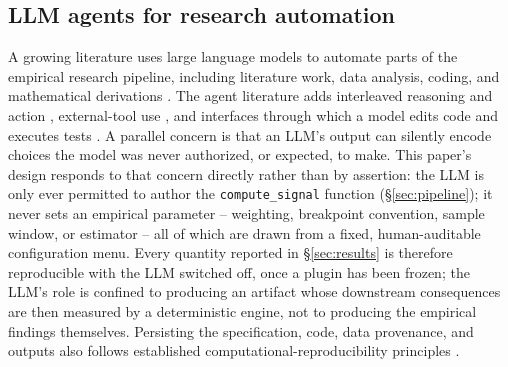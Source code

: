 \subsection{LLM agents for research automation}

A growing literature uses large language models to automate parts of the
empirical research pipeline, including literature work, data analysis, coding,
and mathematical derivations \citep{Korinek2023}. The agent literature adds
interleaved reasoning and action \citep{YaoEtAl2023ReAct}, external-tool use
\citep{SchickEtAl2023Toolformer}, and interfaces through which a model edits
code and executes tests \citep{YangEtAl2024SWEAgent}. A parallel concern is
that an LLM's output can silently encode choices the model was never
authorized, or expected, to make. This paper's design responds to that concern
directly rather than by assertion: the LLM is only ever permitted to author
the \texttt{compute\_signal} function (\S\ref{sec:pipeline}); it never sets an
empirical parameter -- weighting, breakpoint convention, sample window, or
estimator -- all of which are drawn from a fixed, human-auditable configuration
menu. Every quantity reported in \S\ref{sec:results} is therefore reproducible
with the LLM switched off, once a plugin has been frozen; the LLM's role is
confined to producing an artifact whose downstream consequences are then
measured by a deterministic engine, not to producing the empirical findings
themselves. Persisting the specification, code, data provenance, and outputs
also follows established computational-reproducibility principles
\citep{StoddenEtAl2016}.

